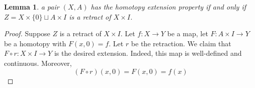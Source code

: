 \documentclass[10pt, oneside]{amsart}
\newtheorem{lemma}{Lemma}
\theoremstyle{definition}
\begin{document}
\begin{lemma}
a pair $(X, A)$ has the homotopy extension property if and only if $Z = X \times \{0\} \sqcup A \times I$ is a retract of $X \times I$.
\end{lemma}
\begin{proof}
  Suppose $Z$ is a retract of $X \times I$. Let $f : X \rightarrow Y$ be a map, let $F : A \times I \rightarrow Y$ be a homotopy with $F(x, 0) = f$. Let $r$ be the retraction.
  We claim that $F \circ r : X \times I \rightarrow Y$ is the desired extension. Indeed, this map is well-defined and continuous. Moreover,
  \begin{equation}
    (F \circ r)(x, 0) = F(x, 0) = f(x)
  \end{equation}

  \end{proof}

\vspace{20pt}
    
\end{document}
